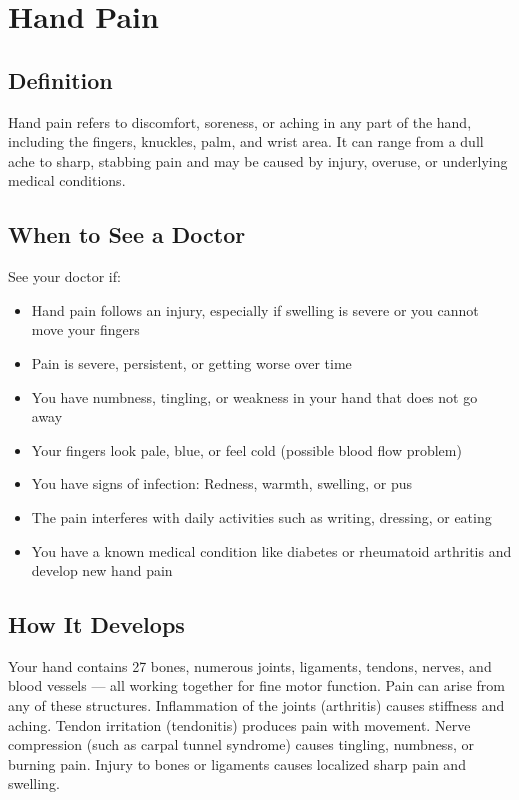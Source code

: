 \chapter{Hand Pain}

\section*{Definition}
Hand pain refers to discomfort, soreness, or aching in any part of the hand, including the fingers, knuckles, palm, and wrist area. It can range from a dull ache to sharp, stabbing pain and may be caused by injury, overuse, or underlying medical conditions.

\section*{When to See a Doctor}
See your doctor if:
\begin{itemize}
  \item Hand pain follows an injury, especially if swelling is severe or you cannot move your fingers
  \item Pain is severe, persistent, or getting worse over time
  \item You have numbness, tingling, or weakness in your hand that does not go away
  \item Your fingers look pale, blue, or feel cold (possible blood flow problem)
  \item You have signs of infection: Redness, warmth, swelling, or pus
  \item The pain interferes with daily activities such as writing, dressing, or eating
  \item You have a known medical condition like diabetes or rheumatoid arthritis and develop new hand pain
\end{itemize}

\section*{How It Develops}
Your hand contains 27 bones, numerous joints, ligaments, tendons, nerves, and blood vessels — all working together for fine motor function. Pain can arise from any of these structures. Inflammation of the joints (arthritis) causes stiffness and aching. Tendon irritation (tendonitis) produces pain with movement. Nerve compression (such as carpal tunnel syndrome) causes tingling, numbness, or burning pain. Injury to bones or ligaments causes localized sharp pain and swelling.

